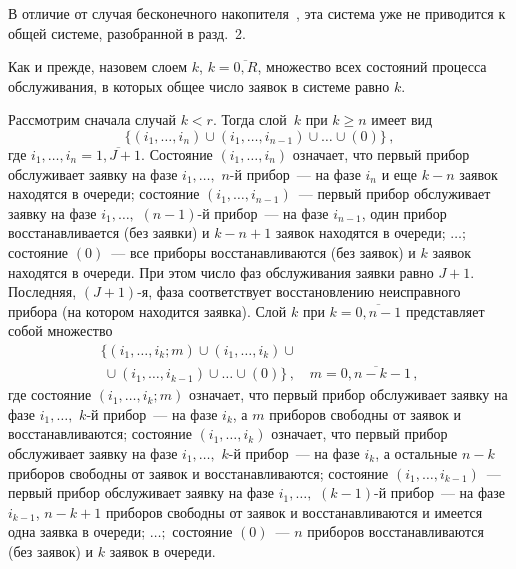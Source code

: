 \begin{multicols}{2}
В отличие от случая бесконечного накопителя~\cite{PSCh06}, эта система
уже не приводится к общей сис\-те\-ме, разобранной в разд.~2.

Как и прежде, назовем слоем $k$, $k=\overline{0,R}$, множество
всех состояний процесса обслуживания, в которых общее число заявок
в системе равно $k$.

Рассмотрим сначала случай $k<r$.
Тогда слой~$k$ при $k \geq n$ имеет вид
$$
\{(i_1,\ldots,i_n) \cup
(i_1,\ldots,i_{n-1})
\cup \ldots \cup (0)\}\,,
$$
где $i_1,\ldots,i_n=\overline{1,J+1}$.
Состояние $(i_1,\ldots,i_n)$ означает, что первый прибор обслуживает
заявку на фазе $i_1,\ldots,$ $n$-й прибор~--- на фазе $i_n$ и еще
$k-n$ заявок находятся в очереди;
состояние $(i_1,\ldots,i_{n-1})$~--- первый прибор обслуживает
заявку на фазе $i_1,\ldots,$ $(n{-}1)$-й прибор~--- на фазе $i_{n-1}$,
один прибор восстанавливается (без заявки) и $k-n+1$ заявок находятся в
очереди;
$\ldots;$ состояние $(0)$~--- все приборы восстанавливаются (без заявок) и
$k$ заявок находятся в очереди.
При этом число фаз обслуживания заявки равно $J+1$.
Последняя, $(J{+}1)$-я, фаза соответствует восстановлению неисправного
прибора (на котором находится заявка).
Слой $k$ при $k=\overline{0,n-1}$ представляет собой множество
\begin{multline*}
\!\!\{(i_1,\ldots,i_k;m) \cup
(i_1,\ldots,i_k) \cup\\
\ \cup (i_1,\ldots,i_{k-1})
\cup \ldots \cup
(0)\}\,,\quad
  m=\overline{0,n-k-1}\,,
\end{multline*}
где
состояние $(i_1,\ldots,i_k;m)$ означает, что первый прибор обслуживает
заявку на фазе $i_1,\ldots,$ $k$-й прибор~--- на фазе $i_k$, а
$m$ приборов свободны от заявок и восстанавливаются;
состояние $(i_1,\ldots,i_k)$ означает, что первый прибор обслуживает
заявку на фазе $i_1,\ldots,$ $k$-й прибор~--- на фазе $i_k$, а
остальные $n-k$ приборов свободны от заявок и восстанавливаются;
состояние $(i_1,\ldots,i_{k-1})$~--- первый прибор обслуживает заявку
на фазе $i_1,\ldots,$ $(k{-}1)$-й прибор~--- на фазе $i_{k-1}$,
$n-k+1$ приборов свободны от заявок и восстанавливаются и имеется одна
заявка в очереди;
$\ldots;$
состояние $(0)$~--- $n$ приборов восстанавливаются (без заявок) и $k$
заявок в очереди.


\end{multicols}

